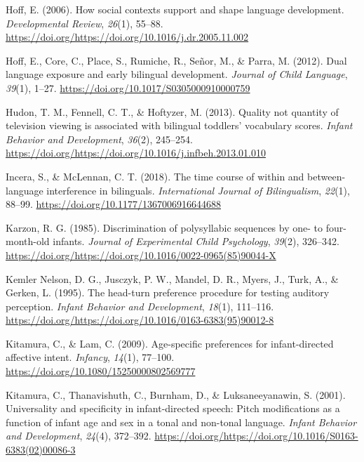 \documentclass[english,,man,floatsintext]{apa6}
\begin{document}
\leavevmode\hypertarget{ref-hoff_2006}{}%
Hoff, E. (2006). How social contexts support and shape language development. \emph{Developmental Review}, \emph{26}(1), 55--88. \url{https://doi.org/https://doi.org/10.1016/j.dr.2005.11.002}

\leavevmode\hypertarget{ref-hoff_2012}{}%
Hoff, E., Core, C., Place, S., Rumiche, R., Señor, M., \& Parra, M. (2012). Dual language exposure and early bilingual development. \emph{Journal of Child Language}, \emph{39}(1), 1--27. \url{https://doi.org/10.1017/S0305000910000759}

\leavevmode\hypertarget{ref-hudon_2013}{}%
Hudon, T. M., Fennell, C. T., \& Hoftyzer, M. (2013). Quality not quantity of television viewing is associated with bilingual toddlers' vocabulary scores. \emph{Infant Behavior and Development}, \emph{36}(2), 245--254. \url{https://doi.org/https://doi.org/10.1016/j.infbeh.2013.01.010}

\leavevmode\hypertarget{ref-incera_2018}{}%
Incera, S., \& McLennan, C. T. (2018). The time course of within and between-language interference in bilinguals. \emph{International Journal of Bilingualism}, \emph{22}(1), 88--99. \url{https://doi.org/10.1177/1367006916644688}

\leavevmode\hypertarget{ref-karzon_1985}{}%
Karzon, R. G. (1985). Discrimination of polysyllabic sequences by one- to four-month-old infants. \emph{Journal of Experimental Child Psychology}, \emph{39}(2), 326--342. \url{https://doi.org/https://doi.org/10.1016/0022-0965(85)90044-X}

\leavevmode\hypertarget{ref-kemler_nelson_1995}{}%
Kemler Nelson, D. G., Jusczyk, P. W., Mandel, D. R., Myers, J., Turk, A., \& Gerken, L. (1995). The head-turn preference procedure for testing auditory perception. \emph{Infant Behavior and Development}, \emph{18}(1), 111--116. \url{https://doi.org/https://doi.org/10.1016/0163-6383(95)90012-8}

\leavevmode\hypertarget{ref-kitamura_2009}{}%
Kitamura, C., \& Lam, C. (2009). Age-specific preferences for infant-directed affective intent. \emph{Infancy}, \emph{14}(1), 77--100. \url{https://doi.org/10.1080/15250000802569777}

\leavevmode\hypertarget{ref-kitamura_2001}{}%
Kitamura, C., Thanavishuth, C., Burnham, D., \& Luksaneeyanawin, S. (2001). Universality and specificity in infant-directed speech: Pitch modifications as a function of infant age and sex in a tonal and non-tonal language. \emph{Infant Behavior and Development}, \emph{24}(4), 372--392. \url{https://doi.org/https://doi.org/10.1016/S0163-6383(02)00086-3}
\end{document}
